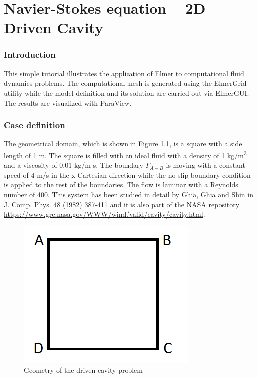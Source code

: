\chapter{Navier-Stokes equation -- 2D -- Driven Cavity}



\subsection*{Introduction}

This simple tutorial illustrates the application of Elmer to computational fluid dynamics problems.
The computational mesh is generated using the ElmerGrid utility while the model definition and its solution are carried out via ElmerGUI. The results are visualized with ParaView.

\subsection*{Case definition}

The geometrical domain, which is shown in Figure \ref{fg:DC_geometry}, is a square with a side length of 1 m. The square is filled with an ideal fluid with a density of 1 kg/m\textsuperscript{3} and a viscosity of 0.01 kg/m s. The boundary $\Gamma_{A-B}$ is moving with a constant speed of 4 m/s in the x Cartesian direction while the no slip boundary condition is applied to the rest of the boundaries. The flow is laminar with a Reynolds number of 400. This system has been studied in detail by Ghia, Ghia and Shin in J. Comp. Phys. 48 (1982) 387-411 and it is also part of the NASA repository \url{https://www.grc.nasa.gov/WWW/wind/valid/cavity/cavity.html}.

\begin{figure}[H]
\centering
\includegraphics[scale=0.7]{DC_geometry}
\caption{Geometry of the driven cavity problem}\label{fg:DC_geometry}
\end{figure}  

